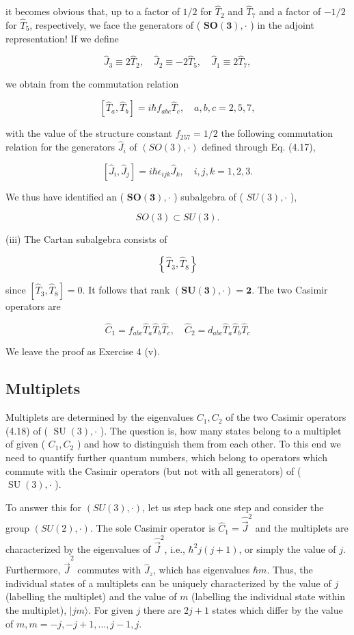 \documentclass[10pt, letterpaper]{article}
\begin{document}
it becomes obvious that, up to a factor of $1 / 2$ for $\hat{T}_{2}$ and $\hat{T}_{7}$ and a factor of $-1 / 2$ for $\hat{T}_{5}$, respectively, we face the generators of ( $\boldsymbol{S O}(\mathbf{3}), \cdot$ ) in the adjoint representation! If we define

$$
\hat{J}_{3} \equiv 2 \hat{T}_{2}, \quad \hat{J}_{2} \equiv-2 \hat{T}_{5}, \quad \hat{J}_{1} \equiv 2 \hat{T}_{7},
$$

we obtain from the commutation relation

$$
\left[\hat{T}_{a}, \hat{T}_{b}\right]=i \hbar f_{a b c} \hat{T}_{c}, \quad a, b, c=2,5,7,
$$

with the value of the structure constant $f_{257}=1 / 2$ the following commutation relation for the generators $\hat{J}_{i}$ of $(S O(3), \cdot)$ defined through Eq. (4.17),

$$
\left[\hat{J}_{i}, \hat{J}_{j}\right]=i \hbar \epsilon_{i j k} \hat{J}_{k}, \quad i, j, k=1,2,3 .
$$

We thus have identified an ( $\boldsymbol{S O}(\mathbf{3}), \cdot$ ) subalgebra of ( $S U(3), \cdot$ ),

$$
S O(3) \subset S U(3) .
$$

(iii) The Cartan subalgebra consists of

$$
\left\{\hat{T}_{3}, \hat{T}_{8}\right\}
$$

since $\left[\hat{T}_{3}, \hat{T}_{8}\right]=0$. It follows that rank $(\boldsymbol{S U}(\mathbf{3}), \cdot)=\mathbf{2}$. The two Casimir operators are

$$
\hat{C}_{1}=f_{a b c} \hat{T}_{a} \hat{T}_{b} \hat{T}_{c}, \quad \hat{C}_{2}=d_{a b c} \hat{T}_{a} \hat{T}_{b} \hat{T}_{c}
$$

We leave the proof as Exercise 4 (v).

\subsection{Multiplets}
Multiplets are determined by the eigenvalues $C_{1}, C_{2}$ of the two Casimir operators (4.18) of ( $\operatorname{SU}(3), \cdot$ ). The question is, how many states belong to a multiplet of given ( $C_{1}, C_{2}$ ) and how to distinguish them from each other. To this end we need to quantify further quantum numbers, which belong to operators which commute with the Casimir operators (but not with all generators) of ( $\operatorname{SU}(3), \cdot$ ).

To answer this for $(S U(3), \cdot)$, let us step back one step and consider the group $(S U(2), \cdot)$. The sole Casimir operator is $\hat{C}_{1}=\hat{\vec{J}}^{2}$ and the multiplets are characterized by the eigenvalues of $\hat{\vec{J}}^{2}$, i.e., $\hbar^{2} j(j+1)$, or simply the value of $j$. Furthermore, $\hat{\vec{J}}^{2}$ commutes with $\hat{J}_{z}$, which has eigenvalues $\hbar m$. Thus, the individual states of a multiplets can be uniquely characterized by the value of $j$ (labelling the multiplet) and the value of $m$ (labelling the individual state within the multiplet), $|j m\rangle$. For given $j$ there are $2 j+1$ states which differ by the value of $m, m=-j,-j+1, \ldots, j-1, j$.
\end{document}
